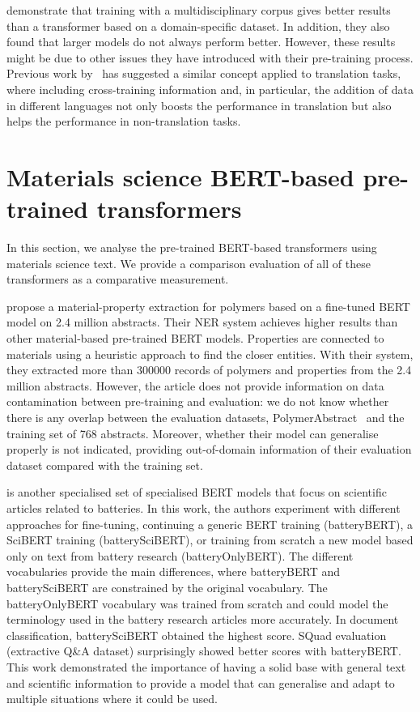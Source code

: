 \cite{hong2022ScholarBERT} demonstrate that training with a multidisciplinary corpus gives better results than a transformer based on a domain-specific dataset. In addition, they also found that larger models do not always perform better. However, these results might be due to other issues they have introduced with their pre-training process. 
Previous work by~\cite{lample2019cross} has suggested a similar concept applied to translation tasks, where including cross-training information and, in particular, the addition of data in different languages not only boosts the performance in translation but also helps the performance in non-translation tasks. 


\section{Materials science BERT-based pre-trained transformers}

In this section, we analyse the pre-trained BERT-based transformers using materials science text. We provide a comparison evaluation of all of these transformers as a comparative measurement. 

\cite{pranav2023a} propose a material-property extraction for polymers based on a fine-tuned BERT model on 2.4 million abstracts. Their NER system achieves higher results than other material-based pre-trained BERT models. Properties are connected to materials using a heuristic approach to find the closer entities.
With their system, they extracted more than 300000 records of polymers and properties from the 2.4 million abstracts. 
However, the article does not provide information on data contamination between pre-training and evaluation: we do not know whether there is any overlap between the evaluation datasets, PolymerAbstract~\cite{huan2016a} and the training set of 768 abstracts. 
Moreover, whether their model can generalise properly is not indicated, providing out-of-domain information of their evaluation dataset compared with the training set. 

\cite{huang2020batterybert} is another specialised set of specialised BERT models that focus on scientific articles related to batteries. In this work, the authors experiment with different approaches for fine-tuning, continuing a generic BERT training (batteryBERT), a SciBERT training (batterySciBERT), or training from scratch a new model based only on text from battery research (batteryOnlyBERT). The different vocabularies provide the main differences, where batteryBERT and batterySciBERT are constrained by the original vocabulary. The batteryOnlyBERT vocabulary was trained from scratch and could model the terminology used in the battery research articles more accurately. 
In document classification, batterySciBERT obtained the highest score. SQuad evaluation (extractive Q\&A dataset) surprisingly showed better scores with batteryBERT. This work demonstrated the importance of having a solid base with general text and scientific information to provide a model that can generalise and adapt to multiple situations where it could be used. 

